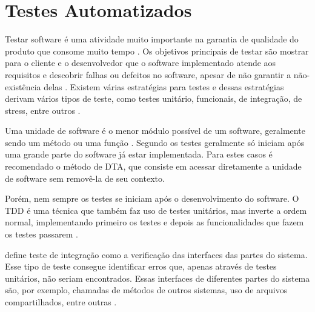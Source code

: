 \section{Testes Automatizados}

Testar software é uma atividade muito importante na garantia de qualidade do produto que consome muito tempo \cite{testing-is-hard}. Os objetivos principais de testar são mostrar para o cliente e o desenvolvedor que o software implementado atende aos requisitos e descobrir falhas ou defeitos no software, apesar de não garantir a não-existência delas \cite{sommerville}. Existem várias estratégias para testes e dessas estratégias derivam vários tipos de teste, como testes unitário, funcionais, de integração, de stress, entre outros \cite{art-of-testing}.

Uma unidade de software é o menor módulo possível de um software, geralmente sendo um método ou uma função \cite{runeson}. Segundo  os testes geralmente só iniciam após uma grande parte do software já estar implementada. Para estes casos é recomendado o método de DTA, que consiste em acessar diretamente a unidade de software sem removê-la de seu contexto.

Porém, nem sempre os testes se iniciam após o desenvolvimento do software. O TDD é uma técnica que também faz uso de testes unitários, mas inverte a ordem normal, implementando primeiro os testes e depois as funcionalidades que fazem os testes passarem \cite{tdd}.

 define teste de integração como a verificação das interfaces das partes do sistema. Esse tipo de teste consegue identificar erros que, apenas através de testes unitários, não seriam encontrados. Essas interfaces de diferentes partes do sistema são, por exemplo, chamadas de métodos de outros sistemas, uso de arquivos compartilhados, entre outras \cite{spillner}.


